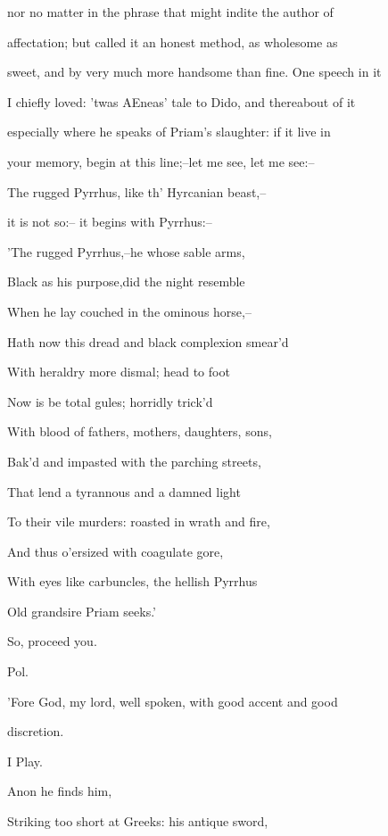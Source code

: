\documentclass[12pt]{book}
\begin{document}
nor no matter in the phrase that might indite the author of

affectation; but called it an honest method, as wholesome as

sweet, and by very much more handsome than fine. One speech in it

I chiefly loved: 'twas AEneas' tale to Dido, and thereabout of it

especially where he speaks of Priam's slaughter: if it live in

your memory, begin at this line;--let me see, let me see:--

  

The rugged Pyrrhus, like th' Hyrcanian beast,--



it is not so:-- it begins with Pyrrhus:--



  'The rugged Pyrrhus,--he whose sable arms,

   Black as his purpose,did the night resemble

   When he lay couched in the ominous horse,--

   Hath now this dread and black complexion smear'd

   With heraldry more dismal; head to foot

   Now is be total gules; horridly trick'd

   With blood of fathers, mothers, daughters, sons,

   Bak'd and impasted with the parching streets,

   That lend a tyrannous and a damned light

   To their vile murders: roasted in wrath and fire,

   And thus o'ersized with coagulate gore,

   With eyes like carbuncles, the hellish Pyrrhus

   Old grandsire Priam seeks.'



So, proceed you.



Pol.

'Fore God, my lord, well spoken, with good accent and good

discretion.



I Play.

   Anon he finds him,

   Striking too short at Greeks: his antique sword,
\end{document}

